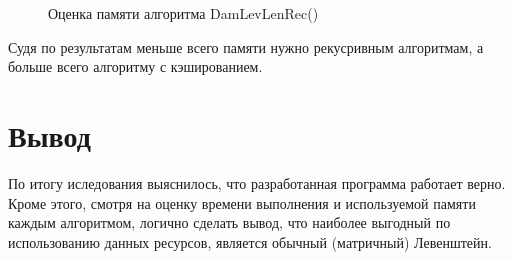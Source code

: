 \begin{figure}
	\caption{Оценка памяти алгоритма DamLevLenRec()}
\end{figure}

\newpage
Судя по результатам меньше всего памяти нужно рекусривным алгоритмам, а больше всего алгоритму с кэшированием.

\section{Вывод}
По итогу иследования выяснилось, что разработанная программа работает верно. Кроме этого, смотря на оценку времени выполнения и используемой памяти каждым алгоритмом, логично сделать вывод, что наиболее выгодный по использованию данных ресурсов, является обычный (матричный) Левенштейн.